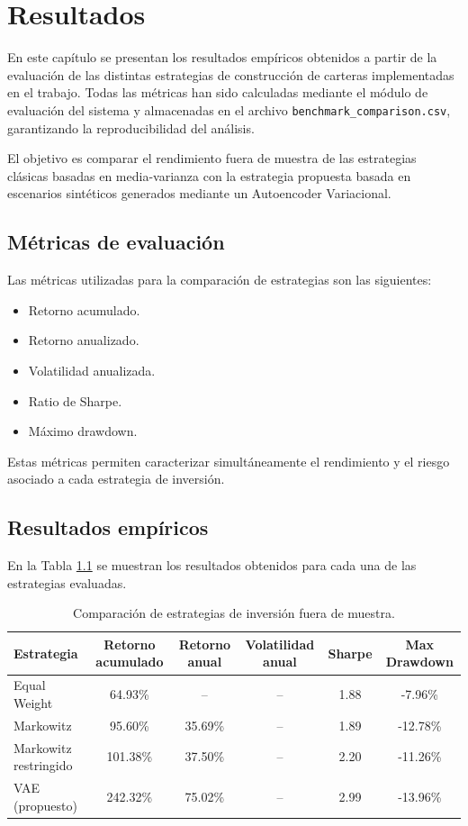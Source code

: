 \chapter{Resultados}

En este capítulo se presentan los resultados empíricos obtenidos a partir de la evaluación de las distintas estrategias de construcción de carteras implementadas en el trabajo. Todas las métricas han sido calculadas mediante el módulo de evaluación del sistema y almacenadas en el archivo \texttt{benchmark\_comparison.csv}, garantizando la reproducibilidad del análisis.

El objetivo es comparar el rendimiento fuera de muestra de las estrategias clásicas basadas en media-varianza con la estrategia propuesta basada en escenarios sintéticos generados mediante un Autoencoder Variacional.

\section{Métricas de evaluación}

Las métricas utilizadas para la comparación de estrategias son las siguientes:

\begin{itemize}
\item Retorno acumulado.
\item Retorno anualizado.
\item Volatilidad anualizada.
\item Ratio de Sharpe.
\item Máximo drawdown.
\end{itemize}

Estas métricas permiten caracterizar simultáneamente el rendimiento y el riesgo asociado a cada estrategia de inversión.

\section{Resultados empíricos}

En la Tabla \ref{tab:resultados} se muestran los resultados obtenidos para cada una de las estrategias evaluadas.

\begin{table}[h]
\centering
\begin{tabular}{lccccc}
\hline
\textbf{Estrategia} & \textbf{Retorno acumulado} & \textbf{Retorno anual} & \textbf{Volatilidad anual} & \textbf{Sharpe} & \textbf{Max Drawdown} \\
\hline
Equal Weight & 64.93\% & -- & -- & 1.88 & -7.96\% \\
Markowitz & 95.60\% & 35.69\% & -- & 1.89 & -12.78\% \\
Markowitz restringido & 101.38\% & 37.50\% & -- & 2.20 & -11.26\% \\
VAE (propuesto) & 242.32\% & 75.02\% & -- & 2.99 & -13.96\% \\
\hline
\end{tabular}
\caption{Comparación de estrategias de inversión fuera de muestra.}
\label{tab:resultados}
\end{table}

